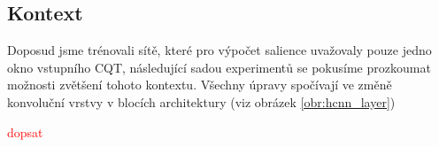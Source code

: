 


\subsection{Kontext}

Doposud jsme trénovali sítě, které pro výpočet salience uvažovaly pouze jedno okno vstupního CQT, následující sadou experimentů se pokusíme prozkoumat možnosti zvětšení tohoto kontextu. Všechny úpravy spočívají ve změně konvoluční vrstvy v blocích architektury (viz obrázek \ref{obr:hcnn_layer})

\textcolor{red}{dopsat}

